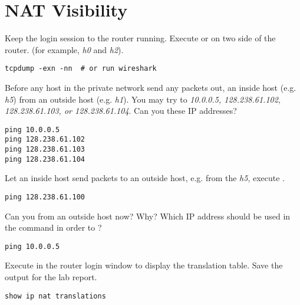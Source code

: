 \documentclass{../UTNetLab}
\begin{document}
\section{NAT Visibility}
Keep the login session to the router running.
Execute  or  on two side of the router.
(for example, \textit{h0} and  \textit{h2}).

\begin{lstlisting}
tcpdump -exn -nn  # or run wireshark
\end{lstlisting}


Before any host in the private network send any packets out,  an inside host (e.g. \textit{h5}) from an outside host (e.g. \textit{h1}).
You may try to  \textit{10.0.0.5, 128.238.61.102, 128.238.61.103, or 128.238.61.104}.
Can you  these IP addresses?

\begin{lstlisting}
ping 10.0.0.5
ping 128.238.61.102
ping 128.238.61.103
ping 128.238.61.104
\end{lstlisting}


Let an inside host send packets to an outside host, e.g. from the \textit{h5}, execute .

\begin{lstlisting}
ping 128.238.61.100
\end{lstlisting}

Can you  from an outside host now? Why? Which IP address should be used in the  command in order to ?

\begin{lstlisting}
ping 10.0.0.5
\end{lstlisting}

Execute  in the router login window to display the translation table.
Save the output for the lab report.

\begin{lstlisting}[language={cisco}, frame=trBL]
show ip nat translations
\end{lstlisting}
\end{document}
